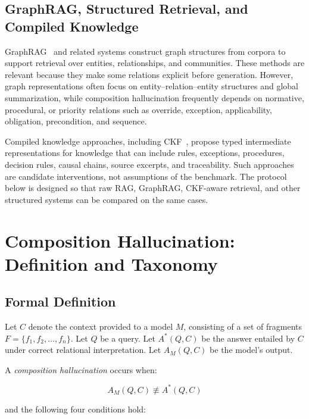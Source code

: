 \documentclass[11pt]{article}
\begin{document}
\subsection{GraphRAG, Structured Retrieval, and Compiled Knowledge}

GraphRAG~\cite{edge2024graphrag} and related systems construct graph structures from corpora to support retrieval over entities, relationships, and communities. These methods are relevant because they make some relations explicit before generation. However, graph representations often focus on entity--relation--entity structures and global summarization, while composition hallucination frequently depends on normative, procedural, or priority relations such as override, exception, applicability, obligation, precondition, and sequence.

Compiled knowledge approaches, including CKF~\cite{tomazinho2026ckf}, propose typed intermediate representations for knowledge that can include rules, exceptions, procedures, decision rules, causal chains, source excerpts, and traceability. Such approaches are candidate interventions, not assumptions of the benchmark. The protocol below is designed so that raw RAG, GraphRAG, CKF-aware retrieval, and other structured systems can be compared on the same cases.

\section{Composition Hallucination: Definition and Taxonomy}

\subsection{Formal Definition}

Let $C$ denote the context provided to a model $M$, consisting of a set of fragments $F = \{f_1, f_2, \ldots, f_n\}$. Let $Q$ be a query. Let $A^*(Q,C)$ be the answer entailed by $C$ under correct relational interpretation. Let $A_M(Q,C)$ be the model's output.

A \emph{composition hallucination} occurs when:

\begin{equation}
A_M(Q,C) \not\equiv A^*(Q,C)
\end{equation}

and the following four conditions hold:
\end{document}
